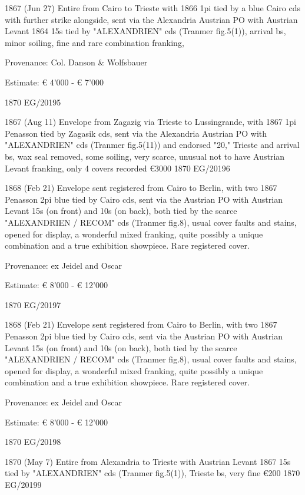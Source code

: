 \documentclass[justified]{tufte-book}
\begin{document}
%
{1867 (Jun 27) Entire from Cairo to Trieste with 1866 1pi tied by a blue Cairo cds with further strike alongside, sent via the Alexandria Austrian PO with Austrian Levant 1864 15s tied by "ALEXANDRIEN" cds (Tranmer fig.5(1)), arrival bs, minor soiling, fine and rare combination franking, 

Provenance: Col. Danson \& Wolfsbauer

Estimate: € 4'000 - € 7'000
}
{1870}%
{EG/20195}%
{}%
{}
{}%
{}

%
{1867 (Aug 11) Envelope from Zagazig via Trieste to Lussingrande, with 1867 1pi Penasson tied by Zagasik cds, sent via the Alexandria Austrian PO with "ALEXANDRIEN" cds (Tranmer fig.5(11)) and endorsed "20," Trieste and arrival bs, wax seal removed, some soiling, very scarce, unusual not to have Austrian Levant franking, only 4 covers recorded
\euro 3000}
{1870}%
{EG/20196}%
{}%
{}
{}%
{}



%
{
1868 (Feb 21) Envelope sent registered from Cairo to Berlin, with two 1867 Penasson 2pi blue tied by Cairo cds, sent via the Austrian PO with Austrian Levant 15s (on front) and 10s (on back), both tied by the scarce "ALEXANDRIEN / RECOM" cds (Tranmer fig.8), usual cover faults and stains, opened for display, a wonderful mixed franking, quite possibly a unique combination and a true exhibition showpiece. Rare registered cover.

Provenance: ex Jeidel and Oscar

Estimate: € 8'000 - € 12'000}
{1870}%
{EG/20197}%
{}%
{}
{}%
{}

%
{
1868 (Feb 21) Envelope sent registered from Cairo to Berlin, with two 1867 Penasson 2pi blue tied by Cairo cds, sent via the Austrian PO with Austrian Levant 15s (on front) and 10s (on back), both tied by the scarce "ALEXANDRIEN / RECOM" cds (Tranmer fig.8), usual cover faults and stains, opened for display, a wonderful mixed franking, quite possibly a unique combination and a true exhibition showpiece. Rare registered cover.

Provenance: ex Jeidel and Oscar

Estimate: € 8'000 - € 12'000}
{1870}%
{EG/20198}%
{}%
{}
{}%
{}

%
{1870 (May 7) Entire from Alexandria to Trieste with Austrian Levant 1867 15s tied by "ALEXANDRIEN" cds (Tranmer fig.5(1)), Trieste bs, very fine
\euro 200 }
{1870}%
{EG/20199}%
{}%
{}
{}%
{}
\end{document}
